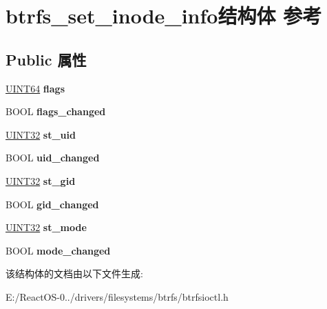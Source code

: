 \hypertarget{structbtrfs__set__inode__info}{}\section{btrfs\+\_\+set\+\_\+inode\+\_\+info结构体 参考}
\label{structbtrfs__set__inode__info}
\subsection*{Public 属性}
\begin{DoxyCompactItemize}
\item 
\mbox{\label{structbtrfs__set__inode__info_aa3444899b04d9eadabccd017aa520437}} 
\hyperlink{_processor_bind_8h_a57be03562867144161c1bfee95ca8f7c}{U\+I\+N\+T64} {\bfseries flags}
\item 
\mbox{\label{structbtrfs__set__inode__info_a31c2de1e4152a062f016157fb9721052}} 
B\+O\+OL {\bfseries flags\+\_\+changed}
\item 
\mbox{\label{structbtrfs__set__inode__info_ac08d9302b0e30bc165df09d811e39042}} 
\hyperlink{_processor_bind_8h_ae1e6edbbc26d6fbc71a90190d0266018}{U\+I\+N\+T32} {\bfseries st\+\_\+uid}
\item 
\mbox{\label{structbtrfs__set__inode__info_adce057f357549e9e107895bfa1fcad47}} 
B\+O\+OL {\bfseries uid\+\_\+changed}
\item 
\mbox{\label{structbtrfs__set__inode__info_aed6628608791a354aa2e590c4594cbcc}} 
\hyperlink{_processor_bind_8h_ae1e6edbbc26d6fbc71a90190d0266018}{U\+I\+N\+T32} {\bfseries st\+\_\+gid}
\item 
\mbox{\label{structbtrfs__set__inode__info_a74d16279f88bf01f065604673800ceb2}} 
B\+O\+OL {\bfseries gid\+\_\+changed}
\item 
\mbox{\label{structbtrfs__set__inode__info_a636c5bf57361a82a8e9aa1848afcc010}} 
\hyperlink{_processor_bind_8h_ae1e6edbbc26d6fbc71a90190d0266018}{U\+I\+N\+T32} {\bfseries st\+\_\+mode}
\item 
\mbox{\label{structbtrfs__set__inode__info_a47f82124233e4f483b634bc25e0db69f}} 
B\+O\+OL {\bfseries mode\+\_\+changed}
\end{DoxyCompactItemize}


该结构体的文档由以下文件生成\+:\begin{DoxyCompactItemize}
\item 
E\+:/\+React\+O\+S-\/0../drivers/filesystems/btrfs/btrfsioctl.\+h\end{DoxyCompactItemize}
